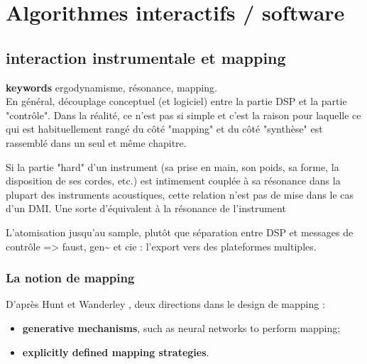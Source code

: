 %
\chapter{Algorithmes interactifs / software}
\label{ch:algorithms}


\section{interaction instrumentale et mapping}

\textbf{keywords} ergodynamisme, résonance, mapping.\\
En général, découplage conceptuel (et logiciel) entre la partie DSP et la partie "contrôle". Dans la réalité, ce n'est pas si simple et c'est la raison pour laquelle ce qui est habituellement rangé du côté "mapping" et du côté "synthèse" est rassemblé dans un seul et même chapitre.

Si la partie "hard" d'un instrument (sa prise en main, son poids, sa forme, la disposition de ses cordes, etc.) est intimement couplée à sa résonance dans la plupart des instruments acoustiques, cette relation n'est pas de mise dans le cas d'un DMI. Une sorte d'équivalent à la résonance de l'instrument 


L’atomisation jusqu’au sample, plutôt que séparation entre DSP et messages de contrôle
=> faust, gen\textasciitilde{ } et cie : l’export vers des plateformes multiples.

\subsection{La notion de mapping}

 \cite{hunt_towards_2000}

D'après Hunt et Wanderley \cite{hunt_mapping_2002}, deux directions dans le design de mapping :
\vspace{-1em}
\begin{itemize}[noitemsep]
	\item \textbf{generative mechanisms}, such as neural networks to perform mapping;
	\item \textbf{explicitly defined mapping strategies}.
\end{itemize}


